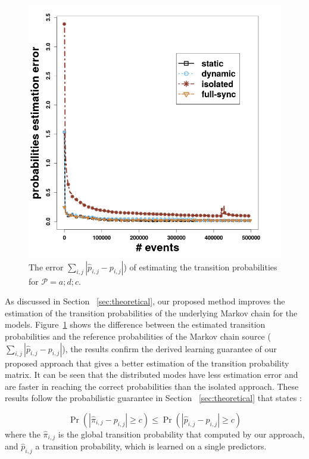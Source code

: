 \begin{figure}[H]
	\centering
	\includegraphics[width=\linewidth]{chapters/figures/synthetic/error_synthetic_15_0001.png}
	
	\caption{The error  $\sum_{i,j} |\hat{p}_{i,j} - {p}_{i,j}|$) of estimating the transition probabilities  for $\mathcal{P}=a;d;c$.}
	\label{fig:error_synthetic}
\end{figure}


As discussed in Section ~\ref{sec:theoretical}, our proposed method improves the estimation of the transition probabilities of the underlying Markov chain for the \pmcmr models. Figure~\ref{fig:error_synthetic} shows the difference between the estimated transition probabilities and the reference probabilities of the Markov chain source ($\sum_{i,j} |\hat{p}_{i,j} - {p}_{i,j}|$), the results confirm the derived learning guarantee of our proposed approach that gives a better estimation of the transition probability matrix. It can be seen that the distributed modes have less estimation error and are faster in reaching the correct probabilities than the isolated approach. These results follow the probabilistic guarantee in Section ~\ref{sec:theoretical} that states :

\[ \Pr\left( |\hat{\pi}_{i,j} - {p}_{i,j}| \geq c \right) \leq
\Pr\left( |\hat{p}_{i,j} - {p}_{i,j}| \geq c \right)
\]
where the $\hat{\pi}_{i,j}$ is the global transition probability that computed by our approach, and $\hat{p}_{i,j}$ a transition probability, which is learned on a single \pmcmr predictors.
  




